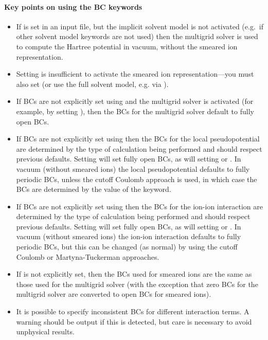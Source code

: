 \documentclass[letterpaper,10pt,english]{sphinxmanual}
\begin{document}
\paragraph{Key points on using the BC keywords}
\label{\detokenize{implicit_solvation_v3:key-points-on-using-the-bc-keywords}}\begin{itemize}
\item {} 
If  is set in an input file, but the implicit solvent
model is not activated (e.g. if other solvent model keywords are not
used) then the multigrid solver is used to compute the Hartree
potential in vacuum, without the smeared ion representation.

\item {} 
Setting  is insufficient to activate the smeared
ion representation—you must also set  (or use
the full solvent model, e.g. via ).

\item {} 
If BCs are not explicitly set using  and the
multigrid solver is activated (for example, by setting
), then the BCs for the multigrid solver
default to fully open BCs.

\item {} 
If BCs are not explicitly set using  then the BCs for the
local pseudopotential are determined by the type of calculation being
performed and should respect previous defaults. Setting
 will set fully open BCs, as will setting
 or . In vacuum
(without smeared ions) the local pseudopotential defaults to fully
periodic BCs, unless the cutoff Coulomb approach is used, in which
case the BCs are determined by the value of the
 keyword.

\item {} 
If BCs are not explicitly set using  then the BCs for
the ion-ion interaction are determined by the type of calculation
being performed and should respect previous defaults. Setting
 will set fully open BCs, as will setting
 or . In vacuum
(without smeared ions) the ion-ion interaction defaults to fully
periodic BCs, but this can be changed (as normal) by using the cutoff
Coulomb or Martyna-Tuckerman approaches.

\item {} 
If  is not explicitly set, then the BCs used for
smeared ions are the same as those used for the multigrid solver
(with the exception that zero BCs for the multigrid solver are
converted to open BCs for smeared ions).

\item {} 
It is possible to specify inconsistent BCs for different interaction
terms. A warning should be output if this is detected, but care is
necessary to avoid unphysical results.

\end{itemize}
\end{document}
